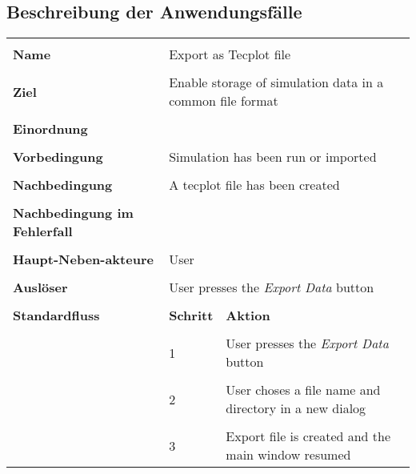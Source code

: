 {\subsection*{Beschreibung der Anwendungsf\"alle}
\begin{tabular}{|p{5cm}|p{2cm}|p{3cm}|}
\hline \\
\textbf{Name} & \multicolumn{2}{p{5cm}|}{Export as Tecplot file} \\
\hline \\
\textbf{Ziel} & \multicolumn{2}{p{5cm}|}{Enable storage of simulation data in a common file format} \\
\hline \\
\textbf{Einordnung} & \multicolumn{2}{p{5cm}|}{} \\
\hline \\
\textbf{Vorbedingung} & \multicolumn{2}{p{5cm}|}{Simulation has been run or imported} \\
\hline \\
\textbf{Nachbedingung} & \multicolumn{2}{p{5cm}|}{A tecplot file has been created} \\
\hline \\
\textbf{Nachbedingung im Fehlerfall} & \multicolumn{2}{p{5cm}|}{}\\
\hline \\
\textbf{Haupt-Neben-akteure} & \multicolumn{2}{p{5cm}|}{User} \\
\hline \\
\textbf{Ausl\"oser} & \multicolumn{2}{p{5cm}|}{User presses the \textit{Export Data} button} \\
\hline \\
\textbf{Standardfluss} & \textbf{Schritt}& \textbf{Aktion} \\
\hline \\
& 1 & User presses the \textit{Export Data} button \\
\hline \\
& 2 & User choses a file name and directory in a new dialog \\
\hline \\
& 3 & Export file is created and the main window resumed \\
\hline
\end{tabular}

}

